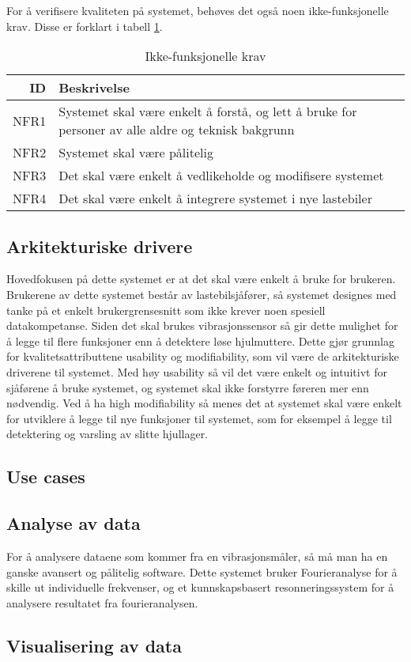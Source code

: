 For å verifisere kvaliteten på systemet, behøves det også noen ikke-funksjonelle krav. Disse er forklart i tabell \ref{tab:nfrequirements}.
\begin{table}[H]
\caption{Ikke-funksjonelle krav}
\label{tab:nfrequirements}
\begin{tabularx}{\textwidth}{r|X}
ID & Beskrivelse \\ 
\hline
NFR1 & Systemet skal være enkelt å forstå, og lett å bruke for personer av alle aldre og teknisk bakgrunn \\
NFR2 & Systemet skal være pålitelig \\
NFR3 & Det skal være enkelt å vedlikeholde og modifisere systemet \\
NFR4 & Det skal være enkelt å integrere systemet i nye lastebiler\\
\hline
\end{tabularx}
\end{table}

\subsection{Arkitekturiske drivere}
Hovedfokusen på dette systemet er at det skal være enkelt å bruke for brukeren. 
Brukerene av dette systemet består av lastebilsjåfører, så systemet designes med tanke på et enkelt brukergrensesnitt som ikke krever noen spesiell datakompetanse. 
Siden det skal brukes vibrasjonssensor så gir dette mulighet for å legge til flere funksjoner enn å detektere løse hjulmuttere. 
Dette gjør grunnlag for kvalitetsattributtene usability og modifiability, som vil være de arkitekturiske driverene til systemet. 
Med høy usability så vil det være enkelt og intuitivt for sjåførene å bruke systemet, og systemet skal ikke forstyrre føreren mer enn nødvendig. 
Ved å ha high modifiability så menes det at systemet skal være enkelt for utviklere å legge til nye funksjoner til systemet, som for eksempel å legge til detektering og varsling av slitte hjullager.


\subsection{Use cases}


\subsection{Analyse av data}
For å analysere dataene som kommer fra en vibrasjonsmåler, så må man ha en ganske avansert og pålitelig software. Dette systemet bruker Fourieranalyse for å skille ut individuelle frekvenser, og et kunnskapsbasert resonneringssystem for å analysere resultatet fra fourieranalysen.


\subsection{Visualisering av data}
